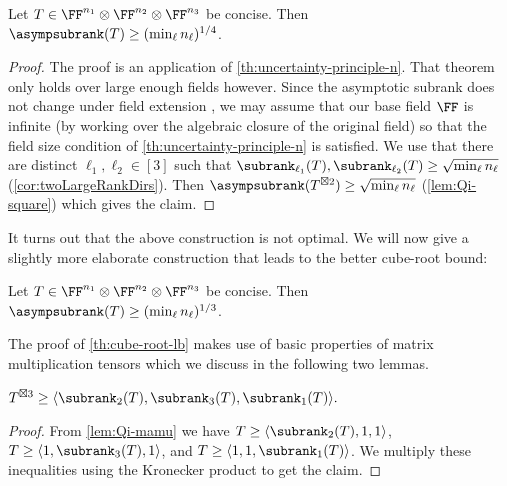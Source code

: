 \begin{theorem}\label{th:fourth-root}
    Let $T \in \FF^{n_1} \otimes \FF^{n_2} \otimes \FF^{n_3}$ be concise. Then $\asympsubrank(T) \geq (\min_\ell n_\ell)^{1/4}$.
\end{theorem}
\begin{proof}
The proof is an application of \autoref{th:uncertainty-principle-n}.
That theorem only holds over large enough fields however. 
Since the asymptotic subrank does not change under field extension \cite[Theorem~3.10]{strassen1988asymptotic}, we may assume that our base field $\FF$ is infinite (by working over the algebraic closure of the original field) so that the field size condition of \autoref{th:uncertainty-principle-n} is satisfied. %
We use that there are distinct $\ell_1, \ell_2 \in [3]$ such that 
$\subrank_{\ell_1}(T), \subrank_{\ell_2}(T) \geq \sqrt{\min_\ell n_\ell}$ (\autoref{cor:twoLargeRankDirs}).
Then $\asympsubrank(T^{\boxtimes 2}) \geq \sqrt{\min_\ell n_\ell}$ (\autoref{lem:Qi-square}) which gives the claim. %
\end{proof}




%

It turns out that the above construction is not optimal. We will now give a slightly more elaborate construction that leads to the better cube-root bound:

\begin{theorem}\label{th:cube-root-lb}
    Let $T \in \FF^{n_1} \otimes \FF^{n_2} \otimes \FF^{n_3}$ be concise. Then $\asympsubrank(T) \geq (\min_{\ell} n_\ell)^{1/3}$.
\end{theorem}

The proof of \autoref{th:cube-root-lb} makes use of basic properties of matrix multiplication tensors which we discuss in the following two lemmas. 

\begin{lemma}\label{lem:cube-mamu}
    $T^{\boxtimes 3} \geq \langle \subrank_2(T),\subrank_3(T),\subrank_1(T) \rangle.$
\end{lemma}

\begin{proof}
    From \autoref{lem:Qi-mamu} we have %
    $T \geq \langle \subrank_2(T),1,1\rangle$, 
    $T \geq \langle 1,\subrank_3(T),1\rangle$, and  
    $T \geq \langle 1,1,\subrank_1(T)\rangle$.
We multiply these inequalities using the Kronecker product to get the claim.
\end{proof}


